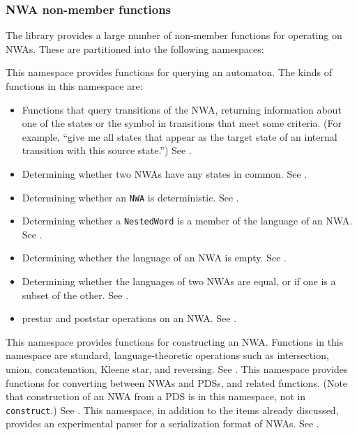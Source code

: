 \subsubsection{NWA non-member functions}

The library provides a large number of non-member functions for operating on
NWAs. These are partitioned into the following namespaces:

\begin{functionlist}
   This namespace provides functions for
    querying an automaton. The kinds of functions in this namespace are:
    \begin{itemize}
      \item Functions that query transitions of
        the NWA, returning information about one of the states or the symbol
        in transitions that meet some criteria. (For example, ``give me all
        states that appear as the target state of an internal transition with
        this source state.'') See .
      \item Determining whether two NWAs have any states in
        common. See .
      \item Determining whether an \texttt{NWA} is deterministic. See
        .
      \item Determining whether a \texttt{NestedWord} is a member of the
        language of an NWA. See .
      \item Determining whether the language of an NWA is empty. See
        .
      \item Determining whether the languages of two NWAs are equal, or if
        one is a subset of the other. See .
      \item prestar and poststar operations on an NWA. See
        .
    \end{itemize}
    
   This namespace provides functions for
    constructing an NWA. Functions in this namespace are standard,
    language-theoretic operations such as intersection, union, concatenation,
    Kleene star, and reversing. See .
   This namespace provides functions for
    converting between NWAs and PDSs, and related functions. (Note that
    construction of an NWA from a PDS is in this namespace, not in
    \texttt{construct}.) See .
   This namespace, in addition to the items already
    discussed, provides an experimental parser for a serialization format of
    NWAs. See .
\end{functionlist}


